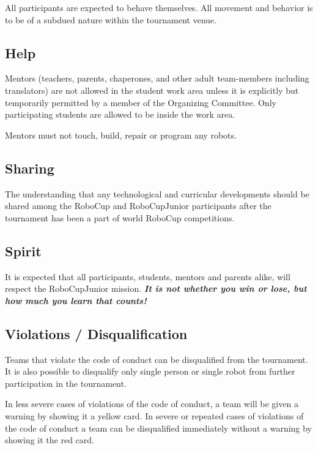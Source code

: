 \documentclass{article}
\begin{document}
All participants are expected to behave themselves. All movement and behavior is to be of a subdued nature within the tournament venue.

\subsection{ Help \label{ref-043}}

Mentors (teachers, parents, chaperones, and other adult team-members including translators) are not allowed in the student work area unless it is explicitly but temporarily permitted by a member of the Organizing Committee. Only participating students are allowed to be inside the work area.

Mentors must not touch, build, repair or program any robots.

\subsection{ Sharing \label{ref-044}}

The understanding that any technological and curricular developments should be shared among the RoboCup and RoboCupJunior participants after the tournament has been a part of world RoboCup competitions.

\subsection{ Spirit \label{ref-045}}

It is expected that all participants, students, mentors and parents alike, will respect the RoboCupJunior mission. \textbf{\textit{It is not whether you win or lose, but how much you learn that counts!}}

\subsection{ Violations / Disqualification \label{ref-046}}

Teams that violate the code of conduct can be disqualified from the tournament. It is also possible to disqualify only single person or single robot from further participation in the tournament.

In less severe cases of violations of the code of conduct, a team will be given a warning by showing it a yellow card. In severe or repeated cases of violations of the code of conduct a team can be disqualified immediately without a warning by showing it the red card.
\end{document}
